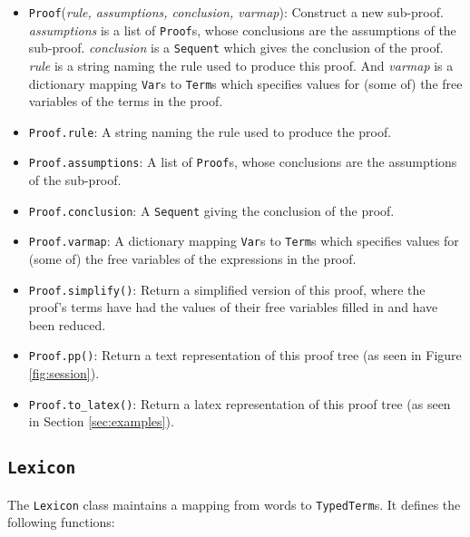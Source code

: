 \documentclass[11pt]{article}
\begin{document}
\begin{itemize}
  \item \texttt{Proof}(\textit{rule, assumptions, conclusion,
  varmap}): Construct a new sub-proof.  \textit{assumptions} is a list
  of \texttt{Proof}s, whose conclusions are the assumptions of the
  sub-proof.  \textit{conclusion} is a \texttt{Sequent} which gives
  the conclusion of the proof.  \textit{rule} is a string naming the
  rule used to produce this proof.  And \textit{varmap} is a
  dictionary mapping \texttt{Var}s to \texttt{Term}s which specifies
  values for (some of) the free variables of the terms in the
  proof.

  \item \texttt{Proof.rule}: A string naming the rule used to produce
  the proof.

  \item \texttt{Proof.assumptions}: A list of \texttt{Proof}s, whose
  conclusions are the assumptions of the sub-proof.

  \item \texttt{Proof.conclusion}: A \texttt{Sequent} giving the
  conclusion of the proof.

  \item \texttt{Proof.varmap}: A dictionary mapping \texttt{Var}s to
  \texttt{Term}s which specifies values for (some of) the free
  variables of the expressions in the proof.

  \item \texttt{Proof.simplify()}: Return a simplified version of this
  proof, where the proof's terms have had the values of their free
  variables filled in and have been reduced.

  \item \texttt{Proof.pp()}: Return a text representation of this proof
  tree (as seen in Figure \ref{fig:session}).

  \item \texttt{Proof.to\_latex()}: Return a latex representation of
  this proof tree (as seen in Section \ref{sec:examples}).
 
\end{itemize}

\subsection{\texttt{Lexicon}}

The \texttt{Lexicon} class maintains a mapping from words to
\texttt{TypedTerm}s.  It defines the following functions:
\end{document}

